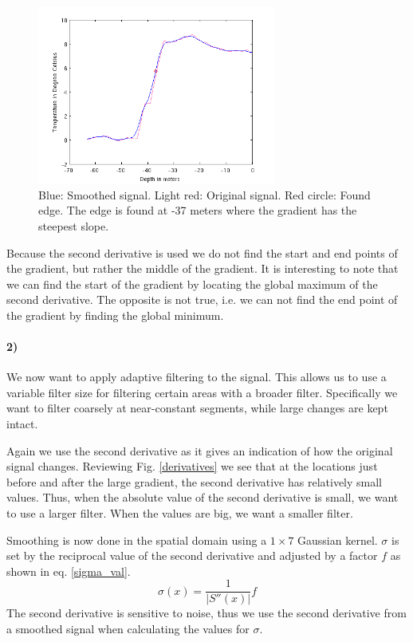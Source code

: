 \documentclass[a4paper, 10pt, final]{article}
\begin{document}
\begin{figure}[!h]
    \centering
    \includegraphics[angle=0,width=0.7\textwidth]{images/signal_org_blur_edge}
    \caption[]{Blue: Smoothed signal. Light red: Original signal. Red
    circle: Found edge. The edge is found at -37 meters where the
    gradient has the steepest slope.}
    \label{signal_org_blur_edge}
\end{figure}

Because the second derivative is used we do not find the start and end
points of the gradient, but rather the middle of the gradient. It is
interesting to note that we can find the start of the gradient by
locating the global maximum of the second derivative. The opposite is
not true, i.e. we can not find the end point of the gradient by finding
the global minimum.

\paragraph{2)}
We now want to apply adaptive filtering to the signal. This allows us to
use a variable filter size for filtering certain areas with a broader
filter. Specifically we want to filter coarsely at near-constant
segments, while large changes are kept intact.

Again we use the second derivative as it gives an indication of how the
original signal changes. Reviewing Fig. \ref{derivatives} we see that at
the locations just before and after the large gradient, the second
derivative has relatively small values. Thus, when the absolute value of
the second derivative is small, we want to use a larger filter. When the
values are big, we want a smaller filter.

Smoothing is now done in the spatial domain using a $1 \times 7$
Gaussian kernel. $\sigma$ is set by the reciprocal value of the second
derivative and adjusted by a factor $f$ as shown in eq. \eqref{sigma_val}.
\begin{equation}
    \sigma(x) = \frac{1}{|S''(x)|}f
    \label{sigma_val}
\end{equation}
The second derivative is sensitive to noise, thus we use the second
derivative from a smoothed signal when calculating the values for
$\sigma$.
\end{document}
